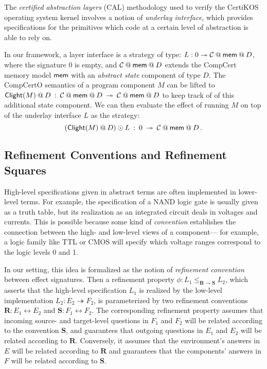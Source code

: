 \begin{example} \label{ex:calcomp} %
The \emph{certified abstraction layers} (CAL) methodology used to verify
the CertiKOS operating system kernel \cite{dscal15}
involves a notion of \emph{underlay interface},
which provides specifications for the primitives which
code at a certain level of abstraction is able to rely on.

In our framework, a layer interface is a strategy of type:
$
  L : \emptysig \twoheadrightarrow \mathcal{C} \mathbin@ \kw{mem} \mathbin@ D
$,
where the signature $0$ is empty,
and $\mathcal{C} \mathbin@ \kw{mem} \mathbin@ D$
extends the CompCert memory model $ \mathsf{mem} $
with an \emph{abstract state} component of type $D$.
The CompCertO semantics of a program component $M$ can be lifted to
$
  \kw{Clight}(M) \mathbin@ D \: : \:
    \mathcal{C} \mathbin@ \kw{mem} \mathbin@ D \: \twoheadrightarrow \:
    \mathcal{C} \mathbin@ \kw{mem} \mathbin@ D
$
to keep track of of this additional state component. 
We can then evaluate the effect of running $M$
on top of the underlay interface $L$ as the strategy:
\[
  (\kw{Clight}(M) \mathbin@ D) \odot L \: : \:
    \emptysig \: \twoheadrightarrow \:
    \mathcal{C} \mathbin@ \kw{mem} \mathbin@ D
    \,.
\]
\end{example}


\subsection{Refinement Conventions and Refinement Squares} \label{sec:sconv} %

High-level specifications given in abstract terms
are often implemented in lower-level terms.
For example, the specification of a NAND logic gate
is usually given as a truth table,
but its realization as an integrated circuit
deals in voltages and currents.
This is possible because some kind of \emph{convention}
establishes the connection between
the high- and low-level views of a component---%
for example, a logic family like TTL or CMOS
will specify which voltage ranges correspond
to the logic levels 0 and 1.

In our setting, this idea is formalized
as the notion of \emph{refinement convention} between effect signatures.
Then a refinement property
$\phi : L_1 \le_{\mathbf{R} \rightarrow \mathbf{S}} L_2$,
which asserts that the high-level specification $L_1$
is realized by the low-level implementation $L_2 : E_2 \twoheadrightarrow F_2$,
is parameterized by two refinement conventions
$\mathbf{R} : E_1 \leftrightarrow E_2$ and
$\mathbf{S} : F_1 \leftrightarrow F_2$.
The corresponding refinement property assumes that incoming
source- and target-level questions in $F_1$ and $F_2$
will be related according to the convention $\mathbf{S}$,
and guarantees that outgoing questions in $E_1$ and $E_2$
will be related according to $\mathbf{R}$.
Conversely, it assumes that
the environment's answers in $E$
will be related according to $\mathbf{R}$
and guarantees that the components' answers in $F$
will be related according to $\mathbf{S}$.

